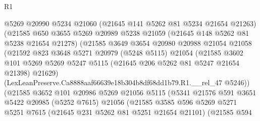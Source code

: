 \begin{lexlean}{R1}
\begin{coremodule}
                          @5269
                          @20990
                          @5234
                          @21060
                          (@21645 @141 @5262 @81 @5234 @21654 @21263)
                          (@21585
                            @650
                            @3655
                            @5269
                            @20989
                            @5238
                            @21059
                            (@21645 @148 @5262 @81 @5238 @21654 @21278)
                            (@21585
                              @3649
                              @3654
                              @20980
                              @20988
                              @21054
                              @21058
                              (@21592
                                @823
                                @3648
                                @5271
                                @20979
                                (@5248 @5115)
                                @21054
                                (@21585
                                  @3602
                                  @101
                                  @5269
                                  @5269
                                  @5247
                                  @5115
                                  (@21645 @206 @5262 @81 @5247 @21654 @21398)
                                  @21629)
                                (LexLeanPreserve.Ca8888aaf66639e18b304b8df68dd1b79.R1.__rel_47
                                  @5246))
                              (@21585
                                @3652
                                @101
                                @20986
                                @5269
                                @21056
                                @5115
                                (@5341
                                  @21576
                                  @591
                                  @3651
                                  @5422
                                  @20985
                                  (@5252 @7615)
                                  @21056
                                  (@21585
                                    @3585
                                    @596
                                    @5269
                                    @5271
                                    @5251
                                    @7615
                                    (@21645 @231 @5262 @81 @5251 @21654 @21101)
                                    (@21585
                                      @594

\end{coremodule}
\end{lexlean}
